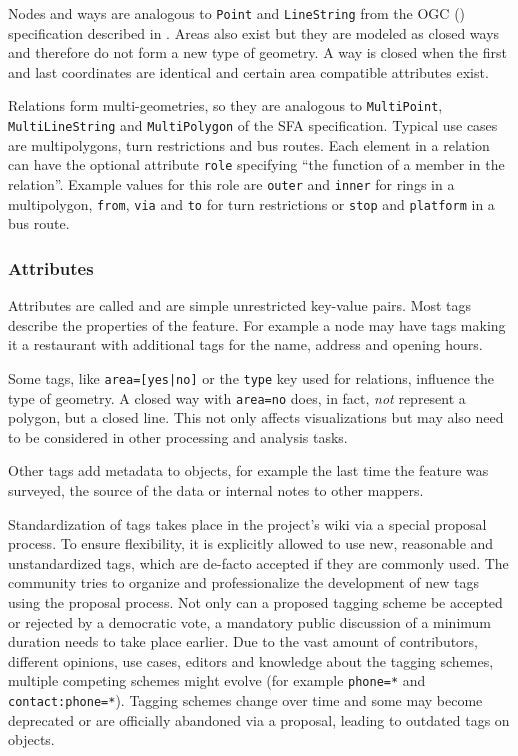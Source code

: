 			Nodes and ways are analogous to \texttt{Point} and \texttt{LineString} from the OGC  () specification described in .
			Areas also exist but they are modeled as closed ways and therefore do not form a new type of geometry.
			A way is closed when the first and last coordinates are identical and certain area compatible attributes exist.
			
			Relations form multi-geometries, so they are analogous to \texttt{MultiPoint}, \texttt{MultiLineString} and \texttt{MultiPolygon} of the SFA specification.
			Typical use cases are multipolygons, turn restrictions and bus routes.
			Each element in a relation can have the optional attribute \texttt{role} specifying \enquote{the function of a member in the relation}\cite{osm-wiki-relation}.
			Example values for this role are \texttt{outer} and \texttt{inner} for rings in a multipolygon, \texttt{from}, \texttt{via} and \texttt{to} for turn restrictions or \texttt{stop} and \texttt{platform} in a bus route.
			
		\subsubsection{Attributes}
		\label{subsubsec:osm-attributes}
			
			Attributes are called  and are simple unrestricted key-value pairs.
			Most tags describe the properties of the feature.
			For example a node may have tags making it a restaurant with additional tags for the name, address and opening hours.
			
			Some tags, like \texttt{area=[yes|no]} or the \texttt{type} key used for relations, influence the type of geometry.
			A closed way with \texttt{area=no} does, in fact, \textit{not} represent a polygon, but a closed line.
			This not only affects visualizations but may also need to be considered in other processing and analysis tasks.
			
			Other tags add metadata to objects, for example the last time the feature was surveyed, the source of the data or internal notes to other mappers.
			
			Standardization of tags takes place in the project's wiki via a special proposal process.
			To ensure flexibility, it is explicitly allowed to use new, reasonable and unstandardized tags\cite{osm-wiki-proposal-process}, which are de-facto accepted if they are commonly used.
			The community tries to organize and professionalize the development of new tags using the proposal process.
			Not only can a proposed tagging scheme be accepted or rejected by a democratic vote, a mandatory public discussion of a minimum duration needs to take place earlier.
			Due to the vast amount of contributors, different opinions, use cases, editors and knowledge about the tagging schemes, multiple competing schemes might evolve (for example \texttt{phone=*} and \texttt{contact:phone=*}).
			Tagging schemes change over time and some may become deprecated or are officially abandoned via a proposal, leading to outdated tags on objects.
			
